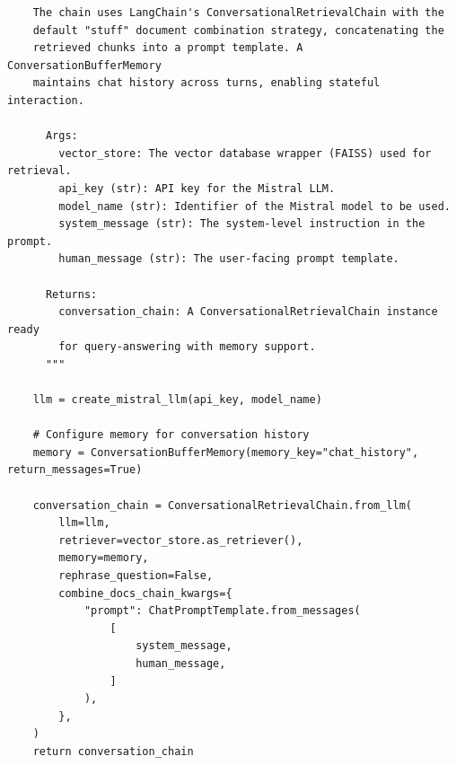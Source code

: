 \begin{spacing}{1.5}
\begin{lstlisting}
    The chain uses LangChain's ConversationalRetrievalChain with the 
    default "stuff" document combination strategy, concatenating the 
    retrieved chunks into a prompt template. A ConversationBufferMemory 
    maintains chat history across turns, enabling stateful interaction.

      Args:
        vector_store: The vector database wrapper (FAISS) used for retrieval.
        api_key (str): API key for the Mistral LLM.
        model_name (str): Identifier of the Mistral model to be used.
        system_message (str): The system-level instruction in the prompt.
        human_message (str): The user-facing prompt template.

      Returns:
        conversation_chain: A ConversationalRetrievalChain instance ready 
        for query-answering with memory support.
      """

    llm = create_mistral_llm(api_key, model_name)
    
    # Configure memory for conversation history
    memory = ConversationBufferMemory(memory_key="chat_history", return_messages=True)

    conversation_chain = ConversationalRetrievalChain.from_llm(
        llm=llm,
        retriever=vector_store.as_retriever(),
        memory=memory,
        rephrase_question=False,
        combine_docs_chain_kwargs={
            "prompt": ChatPromptTemplate.from_messages(
                [
                    system_message,
                    human_message,
                ]
            ),
        },
    )
    return conversation_chain
\end{lstlisting}




\end{spacing}
